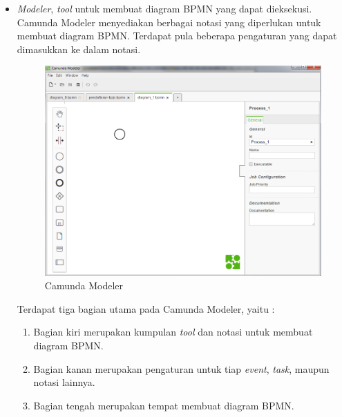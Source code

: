 \begin{itemize}
	\item \textit{Modeler}, \textit{tool} untuk membuat diagram BPMN yang dapat dieksekusi. Camunda Modeler menyediakan berbagai notasi yang diperlukan untuk membuat diagram BPMN. Terdapat pula beberapa pengaturan yang dapat dimasukkan ke dalam notasi.
		\begin{figure}[H]
			\centering
			\includegraphics[scale=0.4]{Gambar/Bab-2/bpms/camundaModeler}
			\caption{Camunda Modeler} 
			\label{fig:camundamodeler}
		\end{figure}
	
		Terdapat tiga bagian utama pada Camunda Modeler, yaitu :
\begin{enumerate}
	\item Bagian kiri merupakan kumpulan \textit{tool} dan notasi untuk membuat diagram BPMN.
	\item Bagian kanan merupakan pengaturan untuk tiap \textit{event}, \textit{task}, maupun notasi lainnya. 
	\item Bagian tengah merupakan tempat membuat diagram BPMN.
\end{enumerate}		
		

\end{itemize}
